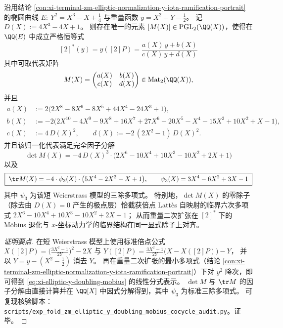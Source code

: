 \begin{conclusion}\label{con:xi-terminal-zm-elliptic-y-doubling-mobius-cocycle}
沿用结论 \ref{con:xi-terminal-zm-elliptic-normalization-y-iota-ramification-portrait} 的椭圆曲线
\(
E:\ Y^{2}=X^{3}-X+\tfrac14
\)
与重量函数
\(
y=X^{2}+Y-\tfrac12
\)。
记
\(
D(X):=4X^{3}-4X+1
\)。
则存在唯一的元素 \([M(X)]\in\mathrm{PGL}_{2}(\QQ(X))\)，使得在 \(\QQ(E)\) 中成立严格恒等式
\begin{equation}\label{eq:xi-elliptic-y-doubling-mobius}
\boxed{\;
[2]^{\ast}(y)=y([2]P)=\frac{a(X)\,y+b(X)}{c(X)\,y+d(X)}\;}
\end{equation}
其中可取代表矩阵
\[
M(X)=
\begin{pmatrix}
a(X) & b(X)\\
c(X) & d(X)
\end{pmatrix}\in\mathrm{Mat}_{2}(\QQ(X)),
\]
并且
\[
\begin{aligned}
a(X)&:=2\bigl(2X^{8}-8X^{6}-8X^{5}+44X^{4}-24X^{3}+1\bigr),\\
b(X)&:=-2\bigl(2X^{10}-4X^{9}-9X^{8}+16X^{7}+27X^{6}-20X^{5}-X^{4}-15X^{3}+10X^{2}+X-1\bigr),\\
c(X)&:=4\,D(X)^{2},\qquad
d(X):=-2\,(2X^{2}-1)\,D(X)^{2}.
\end{aligned}
\]
并且该归一化代表满足完全因子分解
\[
\boxed{\;
\det M(X)=-4\,D(X)^{3}\cdot\bigl(2X^{6}-10X^{4}+10X^{3}-10X^{2}+2X+1\bigr)\;}
\]
以及
\[
\boxed{\;
\tr M(X)=-4\cdot \psi_{3}(X)\cdot \bigl(5X^{4}-2X^{2}-X+1\bigr),\qquad
\psi_{3}(X)=3X^{4}-6X^{2}+3X-1\;}
\]
其中 \(\psi_{3}\) 为该短 Weierstrass 模型的三除多项式。
特别地，\(\det M(X)\) 的零除子（除去由 \(D(X)=0\) 产生的极点层）恰截获倍点 Latt\`es 自映射的临界六次多项式 \(2X^{6}-10X^{4}+10X^{3}-10X^{2}+2X+1\)；
从而重量二次扩张在 \([2]^{\ast}\) 下的 Möbius 退化与 \(x\)-坐标动力学的临界结构在同一显式除子上对齐。
\end{conclusion}
\begin{proof}[证明要点]
在短 Weierstrass 模型上使用标准倍点公式
\(
X([2]P)=\bigl(\frac{3X^{2}-1}{2Y}\bigr)^{2}-2X
\)
与
\(
Y([2]P)=\frac{3X^{2}-1}{2Y}\bigl(X-X([2]P)\bigr)-Y
\)，
并以 \(Y=y-(X^{2}-\tfrac12)\) 消去 \(Y\)。
再在重量二次扩张的最小多项式（结论 \ref{con:xi-terminal-zm-elliptic-normalization-y-iota-ramification-portrait}）下对 \(y^{2}\) 降次，即可得到 \eqref{eq:xi-elliptic-y-doubling-mobius} 的线性分式表示。
\(\det M\) 与 \(\tr M\) 的因子分解由直接计算并在 \(\QQ[X]\) 中因式分解得到，其中 \(\psi_{3}\) 为标准三除多项式。
可复现核验脚本：\texttt{scripts/exp\_fold\_zm\_elliptic\_y\_doubling\_mobius\_cocycle\_audit.py}。证毕。
\end{proof}

